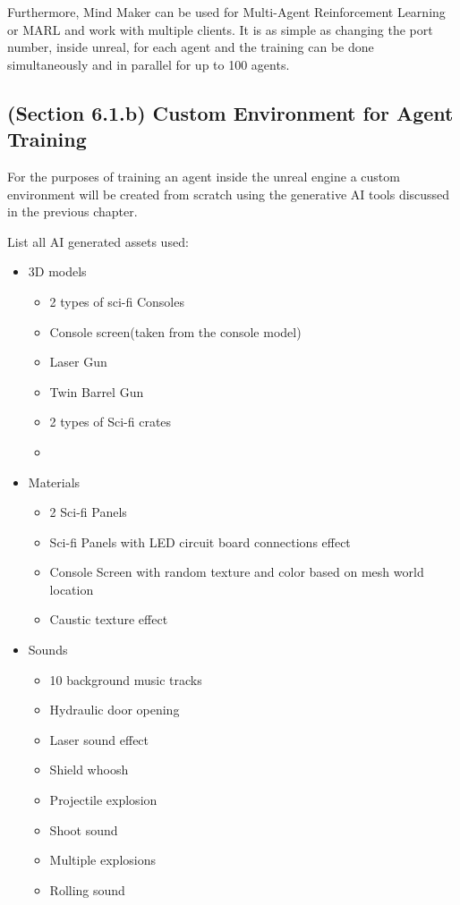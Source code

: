 \documentclass[a4paper,one side,12pt]{book}
\begin{document}
Furthermore, Mind Maker can be used for Multi-Agent Reinforcement
Learning or MARL and work with multiple clients. It is as simple as
changing the port number, inside unreal, for each agent and the training can be done simultaneously and in parallel for up to 100 agents.

\subsection{(Section 6.1.b) Custom Environment for Agent Training }

For the purposes of training an agent inside the unreal engine a custom environment will be created from scratch using the generative AI tools discussed in the previous chapter.

List all AI generated assets used:

\begin{itemize}
\item
  3D models

  \begin{itemize}
  \item
    2 types of sci-fi Consoles
  \item
    Console screen(taken from the console model)
  \item
    Laser Gun
  \item
    Twin Barrel Gun
  \item
    2 types of Sci-fi crates
  \item
  \end{itemize}
\item
  Materials

  \begin{itemize}
  \item 2 Sci-fi Panels
  \item Sci-fi Panels with LED circuit board connections effect
  \item Console Screen with random texture and color based on mesh world location 
  \item Caustic texture effect
  \end{itemize}
\item
  Sounds

  \begin{itemize}
  \item
    10 background music tracks
  \item
    Hydraulic door opening
  \item
    Laser sound effect
  \item
    Shield whoosh
  \item
    Projectile explosion
  \item
    Shoot sound
  \item
    Multiple explosions
  \item
    Rolling sound
  \end{itemize}
\end{itemize}
\end{document}
